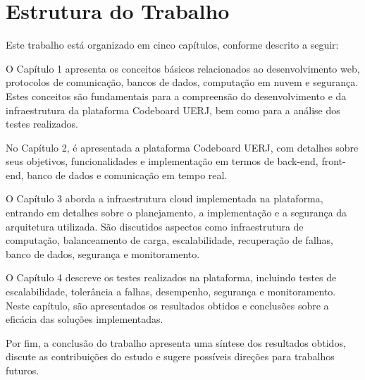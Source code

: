 \section*{Estrutura do Trabalho}

Este trabalho está organizado em cinco capítulos, conforme descrito a seguir:

O Capítulo 1 apresenta os conceitos básicos relacionados ao desenvolvimento web, protocolos de comunicação, bancos de dados, computação em nuvem e segurança. Estes conceitos são fundamentais para a compreensão do desenvolvimento e da infraestrutura da plataforma Codeboard UERJ, bem como para a análise dos testes realizados.

No Capítulo 2, é apresentada a plataforma Codeboard UERJ, com detalhes sobre seus objetivos, funcionalidades e implementação em termos de back-end, front-end, banco de dados e comunicação em tempo real.

O Capítulo 3 aborda a infraestrutura cloud implementada na plataforma, entrando em detalhes sobre o planejamento, a implementação e a segurança da arquitetura utilizada. São discutidos aspectos como infraestrutura de computação, balanceamento de carga, escalabilidade, recuperação de falhas, banco de dados, segurança e monitoramento.

O Capítulo 4 descreve os testes realizados na plataforma, incluindo testes de escalabilidade, tolerância a falhas, desempenho, segurança e monitoramento. Neste capítulo, são apresentados os resultados obtidos e conclusões sobre a eficácia das soluções implementadas.

Por fim, a conclusão do trabalho apresenta uma síntese dos resultados obtidos, discute as contribuições do estudo e sugere possíveis direções para trabalhos futuros.

